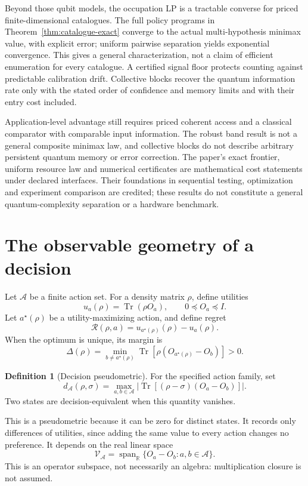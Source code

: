 \documentclass[11pt,a4paper]{article}
\newcommand{\R}{\mathbb R}
\newcommand{\Tr}{\operatorname{Tr}}
\theoremstyle{definition}
\newtheorem{definition}[theorem]{Definition}
\theoremstyle{remark}
\numberwithin{equation}{section}
\begin{document}
Beyond those qubit models, the occupation LP is a tractable converse
for priced finite-dimensional catalogues. The full policy programs in
Theorem~\ref{thm:catalogue-exact} converge to the actual multi-hypothesis
minimax value, with explicit error; uniform pairwise separation yields
exponential convergence. This gives a general characterization, not a
claim of efficient enumeration for every catalogue. A certified signal
floor protects counting against predictable calibration drift. Collective
blocks recover the quantum information rate only with the stated order
of confidence and memory limits and with their entry cost included.

Application-level advantage still requires priced coherent access and
a classical comparator with comparable input information. The robust
band result is not a general composite minimax law, and collective blocks
do not describe arbitrary persistent quantum memory or error correction.
The paper's exact frontier, uniform resource law and numerical certificates
are mathematical cost statements under declared interfaces. Their
foundations in sequential testing, optimization and experiment comparison
are credited; these results do not constitute a general quantum-complexity
separation or a hardware benchmark.

\FloatBarrier
\appendix
\section{The observable geometry of a decision}\label{sec:decisiongeometry}
Let $\mathcal A$ be a finite action set. For a density matrix $\rho$, define
utilities
\begin{equation}
 u_a(\rho)=\Tr(\rho O_a),\qquad 0\preceq O_a\preceq I.
\end{equation}
Let $a^\star(\rho)$ be a utility-maximizing action, and define regret
\begin{equation}
 \mathcal R(\rho,a)=u_{a^\star(\rho)}(\rho)-u_a(\rho).
\end{equation}
When the optimum is unique, its margin is
\begin{equation}
 \Delta(\rho)=\min_{b\ne a^\star(\rho)}
 \Tr\!\left[\rho(O_{a^\star(\rho)}-O_b)\right]>0.
\end{equation}

\begin{definition}[Decision pseudometric]
For the specified action family, set
\begin{equation}\label{eq:decisionmetric}
 d_{\mathcal A}(\rho,\sigma)=
 \max_{a,b\in\mathcal A}
 \left|\Tr[(\rho-\sigma)(O_a-O_b)]\right|.
\end{equation}
Two states are decision-equivalent when this quantity vanishes.
\end{definition}
This is a pseudometric because it can be zero for distinct states.
It records only differences of utilities, since adding the same value to
every action changes no preference. It depends on the real linear space
\begin{equation}
 \mathcal V_{\mathcal A}=
 \operatorname{span}_{\R}\{O_a-O_b:a,b\in\mathcal A\}.
\end{equation}
This is an operator subspace, not necessarily an algebra: multiplication
closure is not assumed.
\end{document}
